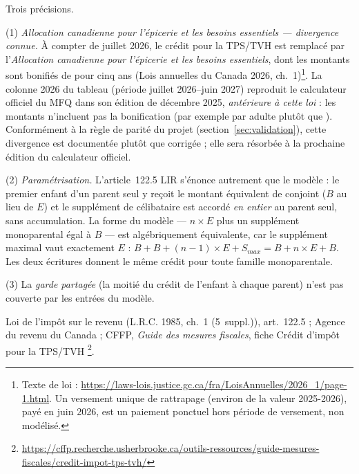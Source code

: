 \pnotes Trois précisions.

(1) \emph{Allocation canadienne pour l'épicerie et les besoins essentiels
--- divergence connue.} À compter de juillet 2026, le crédit pour la
TPS/TVH est remplacé par l'\emph{Allocation canadienne pour l'épicerie et
les besoins essentiels}, dont les montants sont bonifiés de  pour
cinq ans (Lois annuelles du Canada 2026, ch.~1)\footnote{Texte de loi :
\url{https://laws-lois.justice.gc.ca/fra/LoisAnnuelles/2026_1/page-1.html}.
Un versement unique de rattrapage (environ  de la valeur 2025-2026),
payé en juin 2026, est un paiement ponctuel hors période de versement, non
modélisé.}. La colonne 2026 du tableau (période juillet 2026--juin 2027)
reproduit le calculateur officiel du MFQ dans son édition de décembre 2025,
\emph{antérieure à cette loi} : les montants n'incluent pas la bonification
(par exemple  par adulte plutôt que ). Conformément à la
règle de parité du projet (section~\ref{sec:validation}), cette divergence
est documentée plutôt que corrigée ; elle sera résorbée à la prochaine
édition du calculateur officiel.

(2) \emph{Paramétrisation.} L'article~122.5 LIR s'énonce autrement que le
modèle : le premier enfant d'un parent seul y reçoit le montant
\og équivalent de conjoint \fg{} ($B$ au lieu de $E$) et le supplément de
célibataire est accordé \emph{en entier} au parent seul, sans accumulation.
La forme du modèle --- $n \times E$ plus un supplément monoparental égal à
$B$ --- est algébriquement équivalente, car le supplément maximal vaut
exactement $E$ : $B + B + (n-1) \times E + S_{max} = B + n \times E + B$.
Les deux écritures donnent le même crédit pour toute famille monoparentale.

(3) La \emph{garde partagée} (la moitié du crédit de l'enfant à chaque
parent) n'est pas couverte par les entrées du modèle.



\prefs Loi de l'impôt sur le revenu (L.R.C. 1985, ch.~1
(5\ieme{}~suppl.)), art.~122.5 ; Agence du revenu du Canada ; CFFP,
\emph{Guide des mesures fiscales}, fiche \og Crédit d'impôt pour la
TPS/TVH \fg{}\footnote{\url{https://cffp.recherche.usherbrooke.ca/outils-ressources/guide-mesures-fiscales/credit-impot-tps-tvh/}}.
